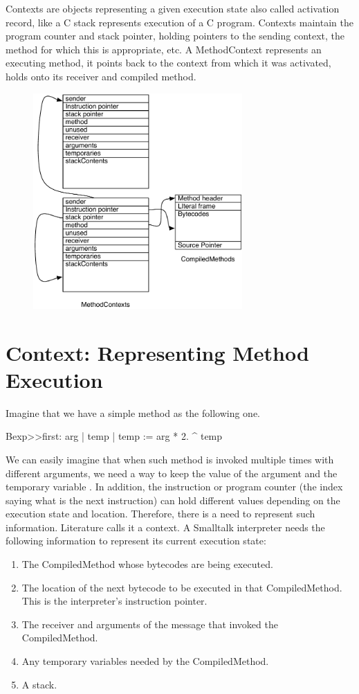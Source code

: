 \documentclass[a4paper,10pt,twoside]{book}
\begin{document}
Contexts are objects representing a given execution state also called activation record, like a C stack represents execution of a C program. Contexts maintain the program counter and stack pointer, holding pointers to the sending context, the method for which this is appropriate, etc. A MethodContext represents an executing method, it points back to the context from which it was activated, holds onto its receiver and compiled method.

\begin{figure}
\begin{center}
\includegraphics[width=8cm]{MethodAndMethodContext}
\end{center}
\end{figure}

\section{Context: Representing Method Execution}
Imagine that we have a simple method as the following one.

\begin{code}{}
Bexp>>first: arg
	| temp |
	temp := arg * 2.
	^ temp
\end{code}

We can easily imagine that when such method is invoked multiple times with different arguments, we need a way to keep
the value of the argument  and the temporary variable . In addition, the instruction or program counter (the index saying what is the next instruction) can hold different values depending on the execution state and location. Therefore, there is a need to represent such information. Literature calls it a context. A Smalltalk interpreter needs the following information to represent its current execution state:
\begin{enumerate}
\item The CompiledMethod whose bytecodes are being executed.
\item The location of the next bytecode to be executed in that
CompiledMethod. This is the interpreter's instruction pointer.
\item The receiver and arguments of the message that invoked the
CompiledMethod.
\item Any temporary variables needed by the CompiledMethod.
\item A stack.
\end{enumerate}
\end{document}

